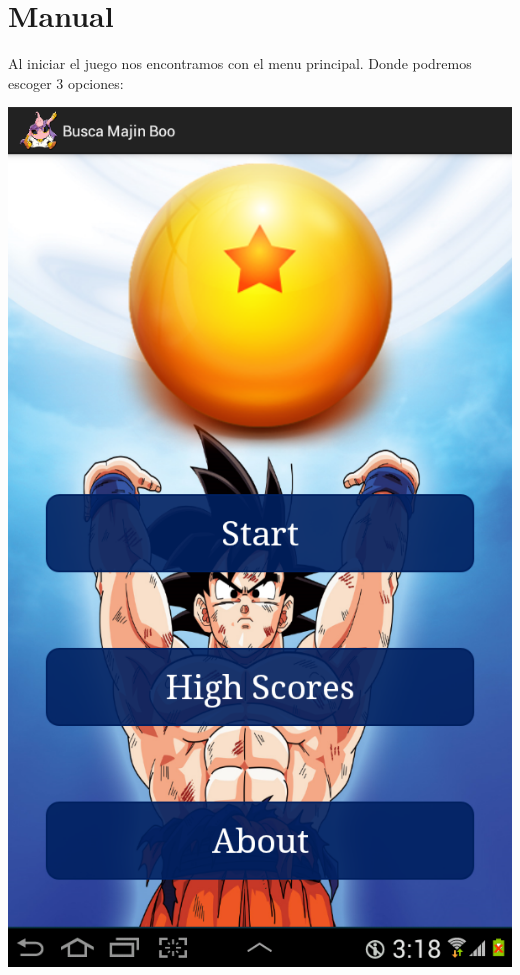 \documentclass[11pt]{article} %
\begin{document}
\section{Manual}
Al iniciar el juego nos encontramos con el menu principal. Donde podremos escoger 3 opciones:
\begin{center}
\includegraphics[scale=0.2]{Imagenes/SSMenuPrincipal.png}
\end{center}
\end{document}
